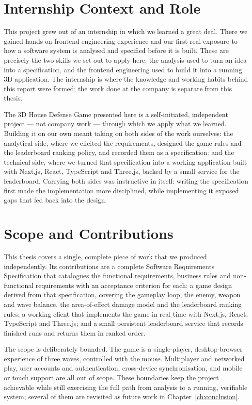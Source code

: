 \documentclass[12pt,a4paper]{report}
\begin{document}
\section{Internship Context and Role}

This project grew out of an internship in which we learned a great deal. There
we gained hands-on frontend engineering experience and our first real exposure to
how a software system is analysed and specified before it is built. These are
precisely the two skills we set out to apply here: the analysis used to turn an
idea into a specification, and the frontend engineering used to build it into a
running 3D application. The internship is where the knowledge and working habits
behind this report were formed; the work done at the company is separate from
this thesis.

The 3D House Defense Game presented here is a self-initiated, independent
project --- not company work --- through which we apply what we learned. Building
it on our own meant taking on both sides of the work ourselves: the analytical
side, where we elicited the requirements, designed the game rules and the
leaderboard ranking policy, and recorded them as a specification; and the
technical side, where we turned that specification into a working application
built with Next.js, React, TypeScript and Three.js, backed by a small service
for the leaderboard. Carrying both sides was instructive in itself: writing the
specification first made the implementation more disciplined, while implementing
it exposed gaps that fed back into the design.

\section{Scope and Contributions}

This thesis covers a single, complete piece of work that we produced
independently. Its contributions are a complete Software Requirements
Specification that catalogues the functional requirements, business rules and
non-functional requirements with an acceptance criterion for each; a game design
derived from that specification, covering the gameplay loop, the enemy, weapon
and wave balance, the area-of-effect damage model and the leaderboard ranking
rules; a working client that implements the game in real time with Next.js,
React, TypeScript and Three.js; and a small persistent leaderboard service that
records finished runs and returns them in ranked order.

The scope is deliberately bounded. The game is a single-player, desktop-browser
experience of three waves, controlled with the mouse. Multiplayer and networked
play, user accounts and authentication, cross-device synchronisation, and mobile
or touch support are all out of scope. These boundaries keep the project
achievable while still exercising the full path from analysis to a running,
verifiable system; several of them are revisited as future work in
Chapter~\ref{ch:conclusion}.
\end{document}
